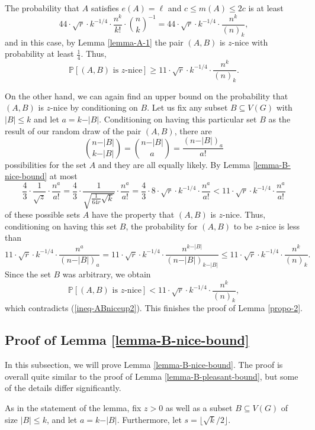 The probability that $A$ satisfies $e(A)=\ell$ and $c\leq m(A)\leq 2c$ is at least
\[44\cdot \sqrt{r}\cdot k^{-1/4}\cdot \frac{n^k}{k!}\cdot {n\choose k}^{-1}=44\cdot \sqrt{r}\cdot k^{-1/4}\cdot\frac{n^k}{(n)_k},\]
and in this case, by Lemma \ref{lemma-A-1} the pair $(A,B)$ is $z$-nice with probability at least $\frac{1}{4}$. Thus, 
\begin{equation}\label{ineq-ABniceup2}
\mathbb{P}[(A,B)\text{ is }z\text{-nice}]\geq 11\cdot \sqrt{r}\cdot k^{-1/4}\cdot\frac{n^k}{(n)_k}.
\end{equation}

On the other hand, we can again find an upper bound on the probability that $(A,B)$ is $z$-nice by conditioning on $B$. Let us fix any subset $B\subseteq V(G)$ with $\vert B\vert \leq k$ and let $a=k-\vert B\vert$. Conditioning on having this particular set $B$ as the result of our random draw of the pair $(A,B)$, there are
\[{n-\vert B\vert\choose k-\vert B\vert}={n-\vert B\vert\choose a}=\frac{(n-\vert B\vert)_a}{a!}\]
possibilities for the set $A$ and they are all equally likely. By Lemma \ref{lemma-B-nice-bound} at most
\[\frac{4}{3}\cdot\frac{1}{\sqrt{z}}\cdot \frac{n^a}{a!}=\frac{4}{3}\cdot\frac{1}{\sqrt{\frac{1}{64r}\sqrt{k}}}\cdot \frac{n^a}{a!}= \frac{4}{3}\cdot 8\cdot \sqrt{r}\cdot k^{-1/4}\cdot \frac{n^a}{a!}<11\cdot \sqrt{r}\cdot k^{-1/4}\cdot \frac{n^a}{a!}\]
of these possible sets $A$ have the property that $(A,B)$ is $z$-nice. Thus, conditioning on having this set $B$, the probability for $(A,B)$ to be $z$-nice is less than
\[11\cdot \sqrt{r}\cdot k^{-1/4}\cdot \frac{n^a}{(n-\vert B\vert)_a}
=11\cdot \sqrt{r}\cdot k^{-1/4}\cdot \frac{n^{k-\vert B\vert}}{(n-\vert B\vert)_{k-\vert B\vert}}\leq 11\cdot \sqrt{r}\cdot k^{-1/4}\cdot \frac{n^k}{(n)_k}.\]
Since the set $B$ was arbitrary, we obtain
\[\mathbb{P}[(A,B)\text{ is }z\text{-nice}]<11\cdot \sqrt{r}\cdot k^{-1/4}\cdot \frac{n^k}{(n)_k},\]
which contradicts (\ref{ineq-ABniceup2}). This finishes the proof of Lemma \ref{propo-2}.

\subsection{Proof of Lemma \ref{lemma-B-nice-bound}}\label{subsect-lemma-proof}

In this subsection, we will prove Lemma \ref{lemma-B-nice-bound}. The proof is overall quite similar to the proof of Lemma \ref{lemma-B-pleasant-bound}, but some of the details differ significantly.

As in the statement of the lemma, fix $z>0$ as well as a subset $B\subseteq V(G)$ of size $\vert B\vert\leq k$, and let $a=k-\vert B\vert$. Furthermore, let $s=\lfloor \sqrt{k}/2\rfloor$. 


